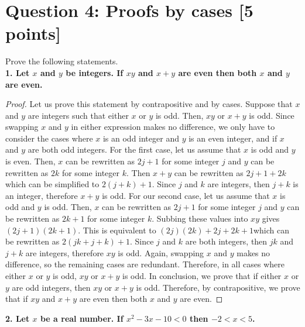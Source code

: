 \documentclass{report}
\theoremstyle{mytheoremstyle}
\theoremstyle{mytheoremstyle}
\theoremstyle{myproblemstyle}
\begin{document}
\section*{\Large{Question 4: Proofs by cases [5 points]}}
Prove the following statements.
\\[\baselineskip]
\textbf{1. Let $x$ and $y$ be integers. If $xy$ and $x+y$ are even then both $x$ and $y$ are even.}
\begin{proof}
Let us prove this statement by contrapositive and by cases. Suppose that $x$ and $y$ are integers such that either $x$ or $y$ is odd. Then, $xy$ or $x+y$ is odd. Since swapping $x$ and $y$ in either expression makes no difference, we only have to consider the cases where $x$ is an odd integer and $y$ is an even integer, and if $x$ and $y$ are both odd integers. For the first case, let us assume that $x$ is odd and $y$ is even. Then, $x$ can be rewritten as $2j+1$ for some integer $j$ and $y$ can be rewritten as $2k$ for some integer $k$. Then $x+y$ can be rewritten as $2j+1+2k$ which can be simplified to $2(j+k)+1$. Since $j$ and $k$ are integers, then $j+k$ is an integer, therefore $x+y$ is odd. For our second case, let us assume that $x$ is odd and $y$ is odd. Then, $x$ can be rewritten as $2j+1$ for some integer $j$ and $y$ can be rewritten as $2k+1$ for some integer $k$. Subbing these values into $xy$ gives $(2j+1)(2k+1)$. This is equivalent to $(2j)(2k)+2j+2k+1$which can be rewritten as $2(jk+j+k)+1$. Since $j$ and $k$ are both integers, then $jk$ and $j+k$ are integers, therefore $xy$ is odd. Again, swapping $x$ and $y$ makes no difference, so the remaining cases are redundant. Therefore, in all cases where either $x$ or $y$ is odd, $xy$ or $x+y$ is odd. In conclusion, we prove that if either $x$ or $y$ are odd integers, then $xy$ or $x+y$ is odd. Therefore, by contrapositive, we prove that if $xy$ and $x+y$ are even then both $x$ and $y$ are even.
\end{proof}
\textbf{2. Let $x$ be a real number. If $x^2-3x-10<0$ then $-2<x<5$.}
\end{document}
